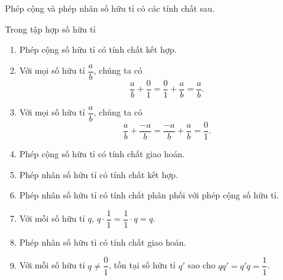 Phép cộng và phép nhân số hữu tỉ có các tính chất sau.
\begin{theorem}
    Trong tập hợp số hữu tỉ
    \begin{enumerate}[label={(F\arabic*)}]
        \item Phép cộng số hữu tỉ có tính chất kết hợp.
        \item Với mọi số hữu tỉ $\dfrac{a}{b}$, chúng ta có
              \[
                  \frac{a}{b} + \frac{0}{1} = \frac{0}{1} + \frac{a}{b} = \frac{a}{b}.
              \]
        \item Với mọi số hữu tỉ $\dfrac{a}{b}$, chúng ta có
              \[
                  \frac{a}{b} + \frac{-a}{b} = \frac{-a}{b} + \frac{a}{b} = \frac{0}{1}.
              \]
        \item Phép cộng số hữu tỉ có tính chất giao hoán.
        \item Phép nhân số hữu tỉ có tính chất kết hợp.
        \item Phép nhân số hữu tỉ có tính chất phân phối với phép cộng số hữu tỉ.
        \item Với mỗi số hữu tỉ $q$, $q\cdot \dfrac{1}{1} = \dfrac{1}{1}\cdot q = q$.
        \item Phép nhân số hữu tỉ có tính chất giao hoán.
        \item Với mỗi số hữu tỉ $q\ne \dfrac{0}{1}$, tồn tại số hữu tỉ $q'$ sao cho $qq' = q'q = \dfrac{1}{1}$.
    \end{enumerate}
\end{theorem}

